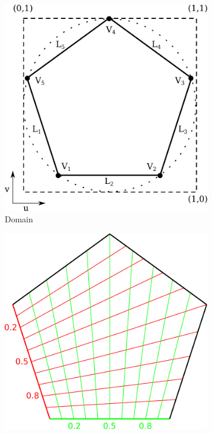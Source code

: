 \documentclass[9pt,academicons]{article}
\begin{document}
\begin{figure}[b!]
  \begin{subfigure}{0.30\textwidth}
    \includegraphics[width = \textwidth]{images/domain.pdf}
    \caption{Domain}
    \label{fig:domain}
  \end{subfigure}
  \hfill
  \begin{subfigure}{0.3\textwidth}
    \begin{minipage}[b][5cm][b]{\textwidth}
      \centering
      \includegraphics[width = \textwidth]{images/s-params.pdf}

\end{minipage}
\end{subfigure}
\end{figure}
\end{document}
